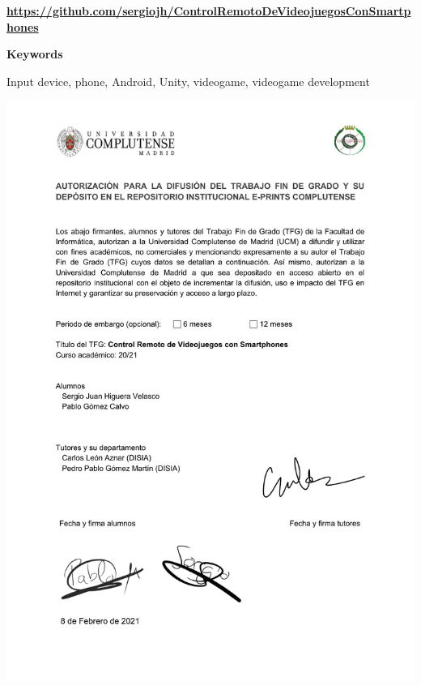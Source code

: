 \scriptsize

\textbf{\url{https://github.com/sergiojh/ControlRemotoDeVideojuegosConSmartphones}}

\normalsize

\addvspace{1cm}

\huge{\textbf{Keywords}}
\normalsize

\addvspace{1cm}

Input device, phone, Android, Unity, videogame, videogame development

\newpage

\includegraphics[width=1.0\textwidth]{./Imagenes/Vectorial/Autorizacion.pdf}


\endinput

